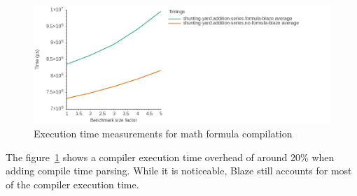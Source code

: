 \documentclass[../../../main]{subfiles}
\begin{document}
\begin{figure}
\includegraphics[scale=0.5]{
  images/shunting-yard.addition-series.graph.png
}
\caption{Execution time measurements for math formula compilation
}\label{fig:sy-rubbish-benchmark-graph}
\end{figure}

The figure~\ref{fig:sy-rubbish-benchmark-graph} shows a compiler execution time
overhead of around 20\% when adding compile time parsing.
While it is noticeable, Blaze still accounts for most of the compiler execution
time.

\clearpage%
\end{document}
